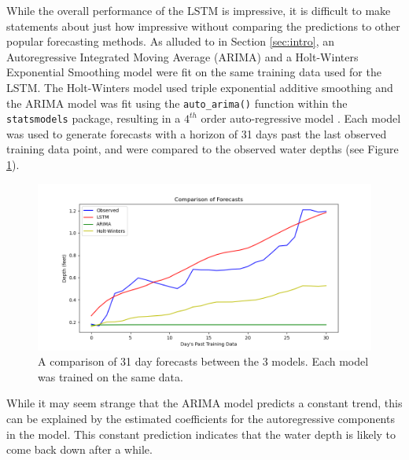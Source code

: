 While the overall performance of the LSTM is impressive, it is difficult to make statements about just how impressive without comparing the predictions to other popular forecasting methods. As alluded to in Section \ref{sec:intro}, an Autoregressive Integrated Moving Average (ARIMA) and a Holt-Winters Exponential Smoothing model were fit on the same training data used for the LSTM. The Holt-Winters model used triple exponential additive smoothing and the ARIMA model was fit using the \texttt{auto\_arima()} function within the \texttt{statsmodels} package, resulting in a $4^{th}$ order auto-regressive model \citep{statsmodels}. Each model was used to generate forecasts with a horizon of 31 days past the last observed training data point, and were compared to the observed water depths (see Figure \ref{fig:Comparison}).

\begin{figure}[ht]
    \centering
    \includegraphics[width=1\linewidth]{"Figures/LSTM_ARIMA_HW.png"}
    \caption{A comparison of 31 day forecasts between the 3 models. Each model was trained on the same data.}
    \label{fig:Comparison}
\end{figure}

While it may seem strange that the ARIMA model predicts a constant trend, this can be explained by the estimated coefficients for the autoregressive components in the model. This constant prediction indicates that the water depth is likely to come back down after a while.